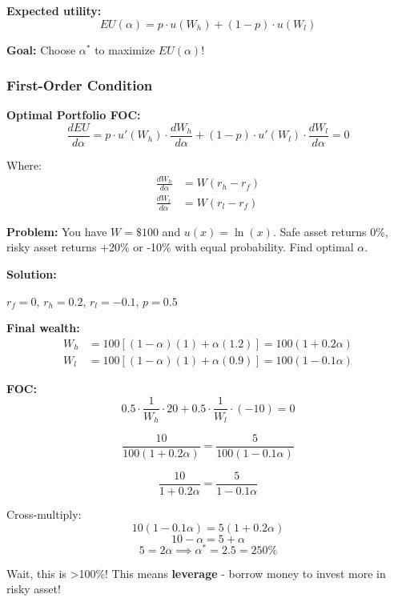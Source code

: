\documentclass[10pt,letterpaper]{article}
\begin{document}
\textbf{Expected utility:}
\[
EU(\alpha) = p \cdot u(W_h) + (1-p) \cdot u(W_l)
\]

\textbf{Goal:} Choose $\alpha^*$ to maximize $EU(\alpha)$!

\subsubsection{First-Order Condition}

\begin{formulabox}
\textbf{Optimal Portfolio FOC:}
\[
\boxed{\frac{dEU}{d\alpha} = p \cdot u'(W_h) \cdot \frac{dW_h}{d\alpha} + (1-p) \cdot u'(W_l) \cdot \frac{dW_l}{d\alpha} = 0}
\]

Where:
\begin{align*}
\frac{dW_h}{d\alpha} &= W(r_h - r_f) \\
\frac{dW_l}{d\alpha} &= W(r_l - r_f)
\end{align*}
\end{formulabox}

\begin{examplebox}
\textbf{Problem:} You have $W = \$100$ and $u(x) = \ln(x)$. Safe asset returns 0\%, risky asset returns +20\% or -10\% with equal probability. Find optimal $\alpha$.

\textbf{Solution:}

$r_f = 0$, $r_h = 0.2$, $r_l = -0.1$, $p = 0.5$

\textbf{Final wealth:}
\begin{align*}
W_h &= 100[(1-\alpha)(1) + \alpha(1.2)] = 100(1 + 0.2\alpha) \\
W_l &= 100[(1-\alpha)(1) + \alpha(0.9)] = 100(1 - 0.1\alpha)
\end{align*}

\textbf{FOC:}
\[
0.5 \cdot \frac{1}{W_h} \cdot 20 + 0.5 \cdot \frac{1}{W_l} \cdot (-10) = 0
\]

\[
\frac{10}{100(1+0.2\alpha)} = \frac{5}{100(1-0.1\alpha)}
\]

\[
\frac{10}{1+0.2\alpha} = \frac{5}{1-0.1\alpha}
\]

Cross-multiply:
\[
10(1-0.1\alpha) = 5(1+0.2\alpha)
\]
\[
10 - \alpha = 5 + \alpha
\]
\[
5 = 2\alpha \implies \boxed{\alpha^* = 2.5 = 250\%}
\]

Wait, this is >100\%! This means \textbf{leverage} - borrow money to invest more in risky asset!
\end{examplebox}

\end{document}
